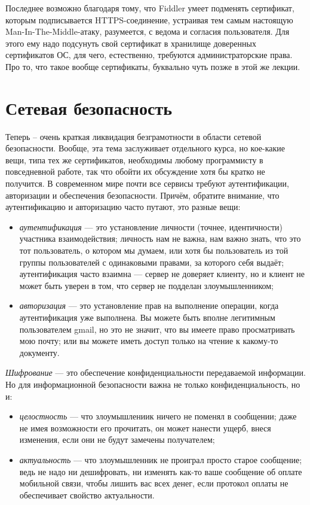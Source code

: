 \documentclass[a5paper]{article}
\begin{document}
Последнее возможно благодаря тому, что Fiddler умеет подменять сертификат, которым подписывается HTTPS-соединение, устраивая тем самым настоящую Man-In-The-Middle-атаку, разумеется, с ведома и согласия пользователя. Для этого ему надо подсунуть свой сертификат в хранилище доверенных сертификатов ОС, для чего, естественно, требуются администраторские права. Про то, что такое вообще сертификаты, буквально чуть позже в этой же лекции.

\section{Сетевая безопасность}

Теперь -- очень краткая ликвидация безграмотности в области сетевой безопасности. Вообще, эта тема заслуживает отдельного курса, но кое-какие вещи, типа тех же сертификатов, необходимы любому программисту в повседневной работе, так что обойти их обсуждение хотя бы кратко не получится. В современном мире почти все сервисы требуют аутентификации, авторизации и обеспечения безопасности. Причём, обратите внимание, что аутентификацию и авторизацию часто путают, это разные вещи:

\begin{itemize}
    \item \textit{аутентификация} --- это установление личности (точнее, идентичности) участника взаимодействия; личность нам не важна, нам важно знать, что это тот пользователь, о котором мы думаем, или хотя бы пользователь из той группы пользователей с одинаковыми правами, за которого себя выдаёт; аутентификация часто взаимна --- сервер не доверяет клиенту, но и клиент не может быть уверен в том, что сервер не подделан злоумышленником;
    \item \textit{авторизация} --- это установление прав на выполнение операции, когда аутентификация уже выполнена. Вы можете быть вполне легитимным пользователем gmail, но это не значит, что вы имеете право просматривать мою почту; или вы можете иметь доступ только на чтение к какому-то документу.
\end{itemize}

\textit{Шифрование} --- это обеспечение конфиденциальности передаваемой информации. Но для информационной безопасности важна не только конфиденциальность, но и:

\begin{itemize}
    \item \textit{целостность} --- что злоумышлениик ничего не поменял в сообщении; даже не имея возможности его прочитать, он может нанести ущерб, внеся изменения, если они не будут замечены получателем;
    \item \textit{актуальность} --- что злоумышленник не проиграл просто старое сообщение; ведь не надо ни дешифровать, ни изменять как-то ваше сообщение об оплате мобильной связи, чтобы лишить вас всех денег, если протокол оплаты не обеспечивает свойство актуальности.
\end{itemize} 
\end{document}
